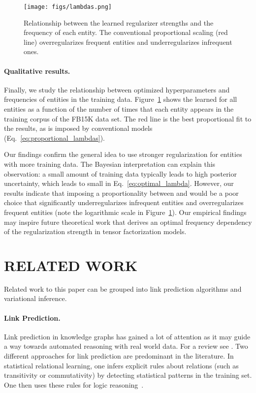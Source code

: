 \documentclass[letterpage]{article}
\begin{document}
\begin{figure}[t!]
  \centering
  \texttt{[image: figs/lambdas.png]}
  \caption{Relationship between the learned regularizer strengths  and the frequency of each entity.
  The conventional proportional scaling (red line) overregularizes frequent entities and underregularizes infrequent ones.}\label{fig:lambda_freq}
\end{figure}


\paragraph{Qualitative results.}
Finally, we study the relationship between optimized hyperparameters and frequencies of entities in the training data.
Figure~\ref{fig:lambda_freq} shows the learned  for all entities  as a function of the number of times  that each entity  appears in the training corpus of the FB15K data set.
The red line is the best proportional fit  to the results, as is imposed by conventional models (Eq.~\ref{eq:proportional_lambdas}).

Our findings confirm the general idea to use stronger regularization for entities with more training data.
The Bayesian interpretation can explain this observation:
a small amount of training data typically leads to high posterior uncertainty, which leads to small  in Eq.~\ref{eq:optimal_lambda}.
However, our results indicate that imposing a proportionality between  and  would be a poor choice that significantly underregularizes infrequent entities and overregularizes frequent entities (note the logarithmic scale in Figure~\ref{fig:lambda_freq}).
Our empirical findings may inspire future theoretical work that derives an optimal frequency dependency of the regularization strength in tensor factorization models.
 \section{RELATED WORK}\label{sec:related}
Related work to this paper can be grouped into link prediction algorithms and variational inference.

\paragraph{Link Prediction.}
Link prediction in knowledge graphs has gained a lot of attention as it may guide a way towards automated reasoning with real world data.
For a review see \citep{nickel2016review}.
Two different approaches for link prediction are predominant in the literature.
In statistical relational learning, one infers explicit rules about relations (such as transitivity or commutativity) by detecting statistical patterns in the training set.
One then uses these rules for logic reasoning~\citep{FGKP1999,KNP2011,NZRS2012,PMGC2015}.
\end{document}
